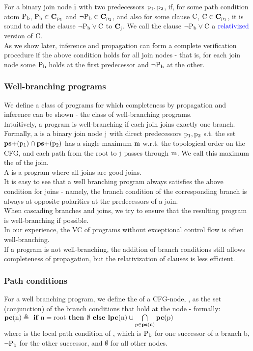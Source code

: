 For a binary join node $\mathrm{j}$ with two predecessors $\mathrm{p_1,p_2}$, if, for some path condition atom $\mathrm{P_b}$, $\mathrm{P_b \in \mathbf{C}_{\mathrm{p_1}}}$ and $\mathrm{\lnot P_b \in \mathbf{C}_{\mathrm{p_2}}}$, and also for some clause $\mathrm{C}$, $\mathrm{C \in \mathbf{C}_{\mathrm{p_1}}}$, it is sound to add the clause $\mathrm{\lnot P_b \lor C}$ to $\mathbf{C}_{\mathrm{j}}$. We call the clause $\mathrm{\lnot P_b \lor C}$ a $\mathrm{\textcolor{blue}{relativized}}$ version of $\mathrm{C}$.\\
As we show later, inference and propagation can form a complete verification procedure if the above condition holds for all join nodes - that is, for each join node some $\mathrm{P_b}$ holds at the first predecessor and $\mathrm{\lnot P_b}$ at the other.


\subsubsection*{Well-branching programs}
We define a class of programs for which completeness by propagation and inference can be shown - the class of well-branching programs.\\
Intuitively, a program is well-branching if each join joins exactly one branch.\\
Formally, a  is a binary join node $\mathrm{j}$ with direct predecessors $\mathrm{p_1,p_2}$ s.t. the set $\mathbf{ps+}(\mathrm{p_1}) \cap \mathbf{ps+}(\mathrm{p_2})$ has a single maximum $\mathrm{m}$ w.r.t. the topological order on the CFG, and each path from the root to $\mathrm{j}$ passes through $\mathrm{m}$. We call this maximum the  of the join.\\
A  is a program where all joins are good joins.\\
It is easy to see that a well branching program always satisfies the above condition for joins - namely, the branch condition of the corresponding branch is always at opposite polarities at the predecessors of a join.\\
When cascading branches and joins, we try to ensure that the resulting program is well-branching if possible.\\
In our experience, the VC of programs without exceptional control flow is often well-branching.\\
If a program is not well-branching, the addition of branch conditions still allows completeness of propagation, 
but the relativization of clauses is less efficient.


\subsubsection*{Path conditions}\label{section_path_condition}
For a well branching program, we define the  of a CFG-node, , as the set (conjunction) of the branch conditions that hold at the node - formally:\\
$\mathrm{\mathbf{pc}(\mathrm{n}) \triangleq \textbf{ if } n=\mathrm{root} \textbf{ then } \emptyset \textbf{ else } \mathbf{lpc}(\mathrm{n}) \cup \bigcap\limits_{p \in \mathbf{ps}(\mathrm{n})} \mathbf{pc}(\mathrm{p})}$\\
where  is the local path condition of , which is $\mathrm{P_b}$ for one successor of a branch b, ${\mathrm{\lnot P_b}}$ for the other successor, and $\emptyset$ for all other nodes.

